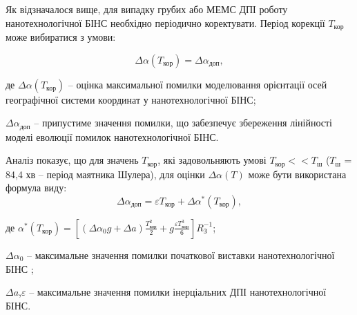 Як відзначалося вище, для випадку грубих або МЕМС ДПІ роботу нанотехнологічної БІНС 
необхідно періодично коректувати. Період корекції ${T}_{\text{кор}} $ може вибиратися 
з умови:

\[\Delta \alpha ({T}_{\text{кор}})=\Delta \alpha_{\text{доп}} ,\] 
\begin{ESKDexplanation}
\item де $\Delta \alpha ({T}_{\text{кор}})$ -- оцінка максимальної помилки моделювання 
орієнтації осей географічної системи координат у нанотехнологічної БІНС;
\item $\Delta \alpha_{\text{доп}} $ -- припустиме значення помилки, що забезпечує збереження 
лінійності моделі еволюції помилок нанотехнологічної БІНС.
\end{ESKDexplanation}
Аналіз показує, що для значень ${T}_{\text{кор}}$, які задовольняють умові ${T}_{\text{кор}} <<T_{\text{ш}} $
($T_{\text{ш}} $ = 84,4 хв -- період маятника Шулера), для оцінки  $\Delta \alpha(T)$ може бути використана формула виду:
\[\Delta \alpha_{\text{доп}}=\varepsilon {T}_{\text{кор}} +\Delta \alpha ^{*} ({T}_{\text{кор}}),\] 
\begin{ESKDexplanation}
\item де $\alpha ^{*} ({T}_{\text{кор}})=\left[\left(\Delta \alpha_{0} g+\Delta a\right)\frac{{T}_{\text{кор}}^{2} }{2} 
+g\frac{\varepsilon {T}_{\text{кор}}^{3} }{6} \right]R_{\text{З}}^{-1} $;     
\item $\Delta \alpha_{0} $ -- максимальне значення помилки початкової виставки нанотехнологічної БІНС ;
\item $\Delta a$,$\varepsilon $ -- максимальне значення помилки інерціальних ДПІ нанотехнологічної БІНС.
\end{ESKDexplanation}

